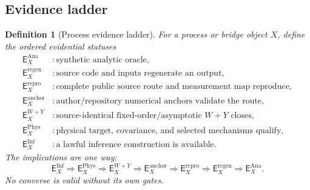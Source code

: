 \documentclass[11pt]{article}
\newtheorem{definition}{Definition}[section]
\newcommand{\WY}{W\!+\!Y}
\newcommand{\Ana}{\ensuremath{\mathrm{Ana}}}
\newcommand{\Phys}{\ensuremath{\mathrm{Phys}}}
\newcommand{\Inf}{\ensuremath{\mathrm{Inf}}}
\begin{document}
\subsection{Evidence ladder}

\begin{definition}[Process evidence ladder]
For a process or bridge object \(X\), define the ordered evidential statuses
\begin{align}
 \mathsf E_X^{\Ana} &: \text{synthetic analytic oracle},\\
 \mathsf E_X^{\mathrm{regen}} &: \text{source code and inputs regenerate an output},\\
 \mathsf E_X^{\mathrm{repro}} &: \text{complete public source route and measurement map reproduce},\\
 \mathsf E_X^{\mathrm{anchor}} &: \text{author/repository numerical anchors validate the route},\\
 \mathsf E_X^{\WY} &: \text{source-identical fixed-order/asymptotic }W+Y\text{ closes},\\
 \mathsf E_X^{\Phys} &: \text{physical target, covariance, and selected mechanisms qualify},\\
 \mathsf E_X^{\Inf} &: \text{a lawful inference construction is available}.
 \label{eq:evidence-ladder}
\end{align}
The implications are one way:
\begin{equation}
 \mathsf E_X^{\Inf}
 \Longrightarrow
 \mathsf E_X^{\Phys}
 \Longrightarrow
 \mathsf E_X^{\WY}
 \Longrightarrow
 \mathsf E_X^{\mathrm{anchor}}
 \Longrightarrow
 \mathsf E_X^{\mathrm{repro}}
 \Longrightarrow
 \mathsf E_X^{\mathrm{regen}}
 \Longrightarrow
 \mathsf E_X^{\Ana}.
 \label{eq:evidence-implications}
\end{equation}
No converse is valid without its own gates.
\end{definition}
\end{document}
